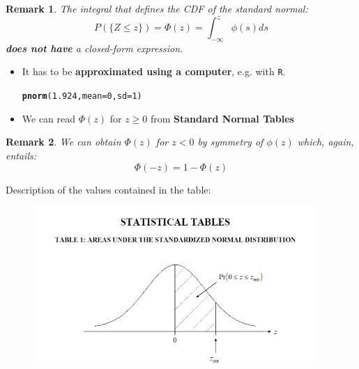 \documentclass[smaller]{beamer}\usepackage[]{graphicx}\usepackage[]{color}
\makeatletter
\newcommand{\hlnum}[1]{\textcolor[rgb]{0.686,0.059,0.569}{#1}}%
\newcommand{\hlstd}[1]{\textcolor[rgb]{0.345,0.345,0.345}{#1}}%
\newcommand{\hlkwc}[1]{\textcolor[rgb]{0.333,0.667,0.333}{#1}}%
\newcommand{\hlkwd}[1]{\textcolor[rgb]{0.737,0.353,0.396}{\textbf{#1}}}%
\newenvironment{kframe}{%
 \def\at@end@of@kframe{}%
 \ifinner\ifhmode%
  \def\at@end@of@kframe{\end{minipage}}%
  \begin{minipage}{\columnwidth}%
 \fi\fi%
 \def\FrameCommand##1{\hskip\@totalleftmargin \hskip-\fboxsep
 \colorbox{shadecolor}{##1}\hskip-\fboxsep
     \hskip-\linewidth \hskip-\@totalleftmargin \hskip\columnwidth}%
 \MakeFramed {\advance\hsize-\width
   \@totalleftmargin\z@ \linewidth\hsize
   \@setminipage}}%
 {\par\unskip\endMakeFramed%
 \at@end@of@kframe}
\newenvironment{knitrout}{}{} %
\newtheorem{remark}{Remark}[section]
\renewcommand{\Pr}{P}
\makeatother
\begin{document}
\begin{frame}{\secname}
  \begin{remark}
  The integral that defines the CDF of the standard normal:
    $$
    \Pr(\{Z\leq z\})=\Phi(z)=\int_{-\infty}^z\phi(s)ds
    $$
    \textbf{does not have} a closed-form expression.
  \end{remark}

  \begin{itemize}
    \item It has to be \textbf{approximated using a computer}, e.g. with \texttt{R}.
\begin{knitrout}
\color{fgcolor}\begin{kframe}
\begin{alltt}
\hlkwd{pnorm}\hlstd{(}\hlnum{1.924}\hlstd{,} \hlkwc{mean} \hlstd{=} \hlnum{0}\hlstd{,} \hlkwc{sd} \hlstd{=} \hlnum{1}\hlstd{)}
\end{alltt}
\end{kframe}
\end{knitrout}
    \item We can read $\Phi(z)$ for $z\geq 0$ from \textbf{Standard Normal Tables}
  \end{itemize}
  \pause
  \begin{remark}
     We can obtain $\Phi(z)$ for $z < 0$ by symmetry of $\phi(z)$ which, again, entails:
     $$\Phi(-z)=1-\Phi(z)$$
  \end{remark}
\end{frame}

\begin{frame}{\secname}
Description of the values contained in the table:
  \begin{figure}[ptb]\centering
  \includegraphics[width=0.95\textwidth,height=0.75\textheight]{img/bell_curve__5.pdf}
  \end{figure}
\end{frame}
\end{document}

